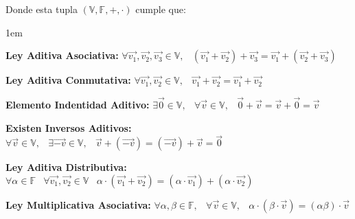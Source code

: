 \documentclass[12pt]{report}                                    %
\newenvironment{Indentation}[1][0.75em]                         %
    {\begin{adjustwidth}{#1}{}}                                     %
    {\end{adjustwidth}}                                             %
\DeclareMathOperator \Space {\quad}                             %
\DeclareMathOperator \MiniSpace {\;}                            %
\begin{document}
            \vspace{30pt}
            
            Donde esta tupla $(\mathbb{V}, \mathbb{F}, +, \cdot)$ cumple que:
            
            \begin{Indentation}[1em]
            \begin{itemize}
            \small{
                
                \item 
                    \textbf{Ley Aditiva Asociativa:}
                    $\forall \vec{v_1}, \vec{v_2}, \vec{v_3} \in \mathbb{V}, \MiniSpace
                        (\vec{v_1} + \vec{v_2}) + \vec{v_3} = \vec{v_1} + (\vec{v_2} + \vec{v_3})$

                \item 
                    \textbf{Ley Aditiva Conmutativa:}
                    $\forall \vec{v_1}, \vec{v_2} \in \mathbb{V}, \MiniSpace
                            \vec{v_1} + \vec{v_2} = \vec{v_1} + \vec{v_2}$


                \item 
                    \textbf{Elemento Indentidad Aditivo:}
                    $\exists \vec{0} \in \mathbb{V}, \MiniSpace
                        \forall \vec{v} \in \mathbb{V}, \MiniSpace \vec{0} + \vec{v} = \vec{v} + \vec{0} = \vec{v}$

                \item 
                    \textbf{Existen Inversos Aditivos:}
                    $\forall \vec{v} \in \mathbb{V}, \MiniSpace
                            \exists \vec{-v} \in \mathbb{V}, \MiniSpace
                                \vec{v} + (\vec{-v}) = (\vec{-v}) + \vec{v} = \vec{0}$


                \item 
                    \textbf{Ley Aditiva Distributiva:}
                    $\forall \alpha \in \mathbb{F} \MiniSpace
                        \forall \vec{v_1}, \vec{v_2} \in \mathbb{V} \MiniSpace
                            \alpha \cdot (\vec{v_1} + \vec{v_2}) = 
                                (\alpha \cdot \vec{v_1}) + (\alpha \cdot \vec{v_2})$

                \item 
                    \textbf{Ley Multiplicativa Asociativa:}
                    $\forall \alpha, \beta \in \mathbb{F}, \MiniSpace
                        \forall \vec{v} \in \mathbb{V}, \MiniSpace
                            \alpha \cdot (\beta \cdot \vec{v}) = (\alpha \beta) \cdot \vec{v}$

}
\end{itemize}
\end{Indentation}
\end{document}
